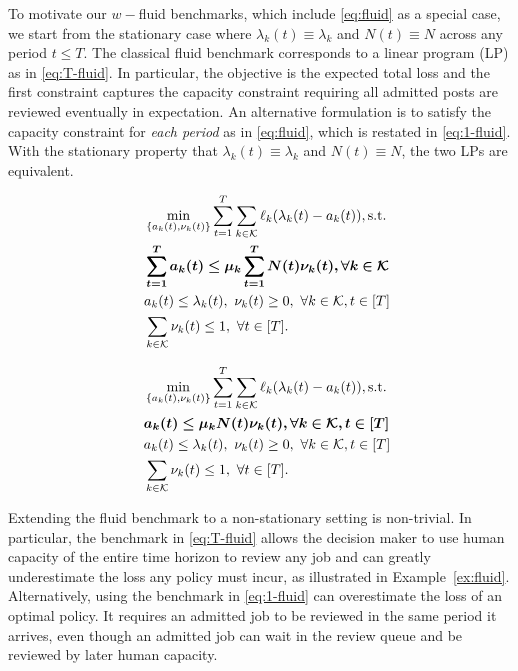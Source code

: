 To motivate our $w-$fluid benchmarks, which include \eqref{eq:fluid} as a special case, we start from the stationary case where $\lambda_k(t) \equiv \lambda_k$ and $N(t) \equiv N$ across any period $t \leq T$. The classical fluid benchmark corresponds to a linear program (LP) as in \eqref{eq:T-fluid}. In particular, the objective is the expected total loss and the first constraint captures the capacity constraint requiring all admitted posts are reviewed eventually in expectation. An alternative formulation is to satisfy the capacity constraint for \emph{each period} as in \eqref{eq:fluid}, which is restated in \eqref{eq:1-fluid}. With the stationary property that $\lambda_k(t) \equiv \lambda_k$ and $N(t) \equiv N$, the two LPs are equivalent. 
 
\noindent
\begin{minipage}[t]{0.5\textwidth}
\begin{equation}\label{eq:T-fluid}
\begin{aligned}
&\min_{\{a_k(t),\nu_k(t)\}}\sum_{t=1}^T \sum_{k \in \mathcal{K}} \ell_k(\lambda_k(t) - a_k(t)),\text{s.t.} \\
\quad& \boldsymbol{\sum_{t=1}^{T} a_k(t) \leq \mu_k\sum_{t=1}^{T} N(t)\nu_k(t),\forall k \in \mathcal{K}} \\
&a_k(t) \leq \lambda_k(t),~\nu_k(t) \geq 0,~\forall k \in \mathcal{K}, t\in [T] \\
& \sum_{k\in \mathcal{K}} \nu_k(t) \leq 1,~\forall t \in [T].
\end{aligned}
\end{equation}
\end{minipage}
\begin{minipage}[t]{0.5\textwidth}
\begin{equation}\label{eq:1-fluid}
\begin{aligned}
&\min_{\{a_k(t),\nu_k(t)\}}\sum_{t=1}^T \sum_{k \in \mathcal{K}} \ell_k(\lambda_k(t) - a_k(t)),\text{s.t.} \\
\quad& \boldsymbol{a_k(t) \leq \mu_k N(t)\nu_k(t),\forall k \in \mathcal{K}, t \in [T]} \\
&a_k(t) \leq \lambda_k(t),~\nu_k(t) \geq 0,~\forall k \in \mathcal{K}, t\in [T] \\
& \sum_{k\in \mathcal{K}} \nu_k(t) \leq 1,~\forall t \in [T].
\end{aligned}
\end{equation}
\end{minipage}
Extending the fluid benchmark to a non-stationary setting is non-trivial. In particular, the benchmark in \eqref{eq:T-fluid} allows the decision maker to use human capacity of the entire time horizon to review any job and can greatly underestimate the loss any policy must incur, as illustrated in Example~\ref{ex:fluid}. Alternatively, using the benchmark in \eqref{eq:1-fluid} can overestimate the loss of an optimal policy. It requires an admitted job to be reviewed in the same period it arrives, even though an admitted job can wait in the review queue and be reviewed by later human capacity.
